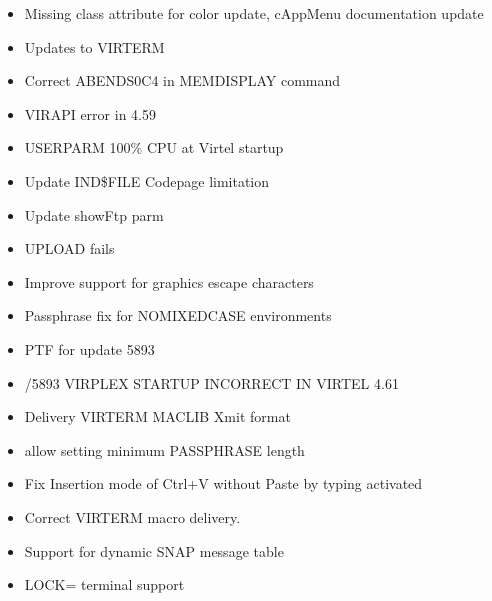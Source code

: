 \documentclass[letterpaper,10pt,english]{sphinxmanual}
\begin{document}
\begin{itemize}
\item {} 
 Missing class attribute for color update, cAppMenu documentation update

\item {} 
 Updates to VIRTERM

\item {} 
 Correct ABENDS0C4 in MEMDISPLAY command

\item {} 
 VIRAPI error in 4.59

\item {} 
 USERPARM 100\% CPU at Virtel startup

\item {} 
 Update IND\$FILE Codepage limitation

\item {} 
 Update showFtp parm

\item {} 
 UPLOAD fails

\item {} 
 Improve support for graphics escape characters

\item {} 
 Passphrase fix for NOMIXEDCASE environments

\item {} 
 PTF for update 5893

\item {} 
/5893 VIRPLEX STARTUP INCORRECT IN VIRTEL 4.61

\item {} 
 Delivery VIRTERM MACLIB Xmit format

\item {} 
 allow setting minimum PASSPHRASE length

\item {} 
 Fix Insertion mode of Ctrl+V without Paste by typing activated

\item {} 
 Correct VIRTERM macro delivery.

\item {} 
 Support for dynamic SNAP message table

\item {} 
 LOCK= terminal support


\end{itemize}
\end{document}
